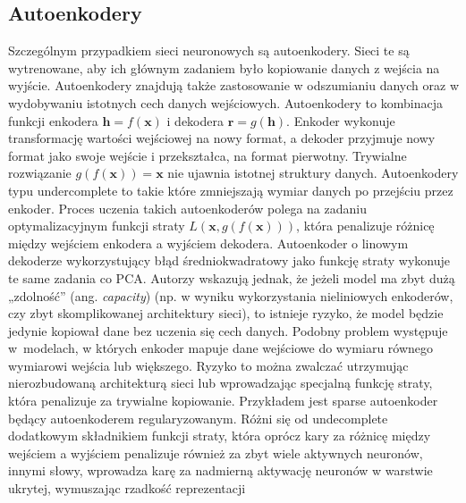 \subsection{Autoenkodery}\cite{deeplearningbook}
Szczególnym przypadkiem sieci neuronowych są autoenkodery. Sieci te są wytrenowane, aby ich głównym zadaniem było kopiowanie danych z wejścia na wyjście. Autoenkodery znajdują także zastosowanie w odszumianiu danych oraz w wydobywaniu istotnych cech danych wejściowych. Autoenkodery to kombinacja funkcji enkodera $\mathbf{h} = f(\mathbf{x})$ i dekodera $\mathbf{r} = g(\mathbf{h})$. Enkoder wykonuje transformację wartości wejściowej na nowy format, a dekoder przyjmuje nowy format jako swoje wejście i przekształca, na format pierwotny.
Trywialne rozwiązanie $g(f(\mathbf{x}))=\mathbf{x}$ nie ujawnia istotnej struktury danych. 
Autoenkodery typu undercomplete to takie które zmniejszają wymiar danych po przejściu przez enkoder. Proces uczenia takich autoenkoderów polega na zadaniu optymalizacyjnym funkcji straty $L(\mathbf{x},g(f(\mathbf{x})))$, która penalizuje różnicę między wejściem enkodera a wyjściem dekodera. Autoenkoder o linowym dekoderze wykorzystujący błąd średniokwadratowy jako funkcję straty wykonuje te same zadania co PCA.
Autorzy \cite{deeplearningbook} wskazują jednak, że jeżeli model ma zbyt dużą „zdolność” (ang. \textit{capacity}) (np. w wyniku wykorzystania nieliniowych enkoderów, czy zbyt skomplikowanej architektury sieci), to istnieje ryzyko, że model będzie jedynie kopiował dane bez uczenia się cech danych. Podobny problem występuje w~modelach, w których enkoder mapuje dane wejściowe do wymiaru równego wymiarowi wejścia lub większego. Ryzyko to można zwalczać utrzymując nierozbudowaną architekturą sieci lub wprowadzając specjalną funkcję straty, która penalizuje za trywialne kopiowanie. 
Przykładem jest sparse autoenkoder będący autoenkoderem regularyzowanym. 
Różni się od undecomplete dodatkowym składnikiem funkcji straty, która oprócz kary za różnicę między wejściem a wyjściem penalizuje również za zbyt wiele aktywnych neuronów, innymi słowy, wprowadza karę za nadmierną aktywację neuronów w warstwie ukrytej, wymuszając rzadkość reprezentacji
